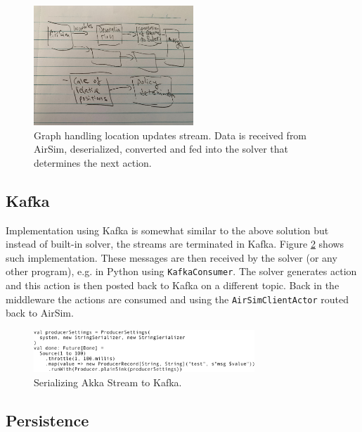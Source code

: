\documentclass{article}
\begin{document}
\begin{figure}
	\centering
	\includegraphics[width=6cm]{flow-in-sketch}
	\caption{Graph handling location updates stream. Data is received from AirSim, deserialized, converted and fed into the solver that determines the next action.}\label{fig:flow-in}
\end{figure}

%

\subsection{Kafka}
Implementation using Kafka is somewhat similar to the above solution but instead of built-in solver, the streams are terminated in Kafka. Figure \ref{fig:kafka-sink} shows such implementation. These messages are then received by the solver (or any other program), e.g. in Python using \verb|KafkaConsumer|. The solver generates action and this action is then posted back to Kafka on a different topic. Back in the middleware the actions are consumed and using the \verb|AirSimClientActor| routed back to AirSim.

\begin{figure}
	\centering
	\includegraphics[width=8.3cm]{kafka-sink}
	\caption{Serializing Akka Stream to Kafka.}\label{fig:kafka-sink}
\end{figure}


\subsection{Persistence}
\end{document}

